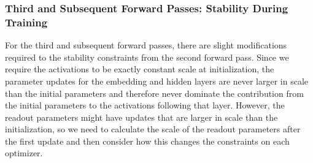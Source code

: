 \begingroup
\begin{table}[h!]
\renewcommand{\arraystretch}{2.5}
\centering
{}
\end{table}
\endgroup
\FloatBarrier
\subsubsection{Third and Subsequent Forward Passes: Stability During Training}
\label{app:theory_third_forward}
For the third and subsequent forward passes, there are slight modifications required to the stability constraints from the second forward pass. Since we require the activations to be exactly constant scale at initialization, the parameter updates for the embedding and hidden layers are never larger in scale than the initial parameters and therefore never dominate the contribution from the initial parameters to the activations following that layer. However, the readout parameters might have updates that are larger in scale than the initialization, so we need to calculate the scale of the readout parameters after the first update and then consider how this changes the constraints on each optimizer.

